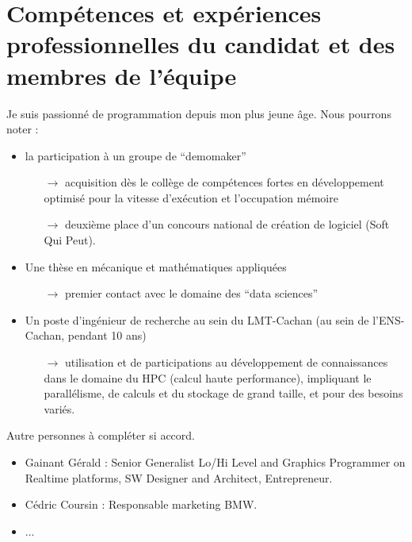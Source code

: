 \documentclass[a4paper,10pt]{scrreprt}
\begin{document}
    \section{Compétences et expériences professionnelles du candidat et des membres de l’équipe}
    
        Je suis passionné de programmation depuis mon plus jeune âge. Nous pourrons noter :
        \begin{itemize}
            \item la participation à un groupe de ``demomaker'' 
                \begin{itemize}
                    \item[$\rightarrow$] acquisition dès le collège de compétences fortes en développement optimisé pour la vitesse d'exécution et l'occupation mémoire
                    \item[$\rightarrow$] deuxième place d'un concours national de création de logiciel (Soft Qui Peut).
                \end{itemize}
                
            \item Une thèse en mécanique et mathématiques appliquées
                \begin{itemize}
                    \item[$\rightarrow$] premier contact avec le domaine des ``data sciences''
                \end{itemize}
            
            \item Un poste d'ingénieur de recherche au sein du LMT-Cachan (au sein de l'ENS-Cachan, pendant 10 ans)
                \begin{itemize}
                    \item[$\rightarrow$] utilisation et de participations au développement de connaissances dans le domaine du HPC (calcul haute performance), impliquant le parallélisme, de calculs et du stockage de grand taille, et pour des besoins variés.
                \end{itemize}
            
        \end{itemize}

        Autre personnes à compléter si accord.
        \begin{itemize}
            \item Gainant Gérald : Senior Generalist Lo/Hi Level and Graphics Programmer on Realtime platforms, SW Designer and Architect, Entrepreneur. 
            \item Cédric Coursin : Responsable marketing BMW.
            \item ...
        \end{itemize}
\end{document}
